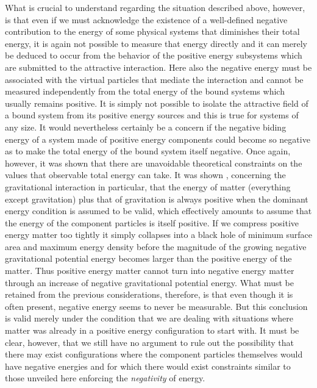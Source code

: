 \documentclass[notitlepage,12pt]{report}
\begin{document}
What is crucial to understand regarding the situation described above, however, is that even if we must acknowledge the existence of a well-defined negative contribution to the energy of some physical systems that diminishes their total energy, it is again not possible to measure that energy directly and it can merely be deduced to occur from the behavior of the positive energy subsystems which are submitted to the attractive interaction. Here also the negative energy must be associated with the virtual particles that mediate the interaction and cannot be measured independently from the total energy of the bound systems which usually remains positive. It is simply not possible to isolate the attractive field of a bound system from its positive energy sources and this is true for systems of any size. It would nevertheless certainly be a concern if the negative biding energy of a system made of positive energy components could become so negative as to make the total energy of the bound system itself negative. Once again, however, it was shown that there are unavoidable theoretical constraints on the values that observable total energy can take. It was shown \cite{Brill-1,Brill-2,Deser-1,Brill-3,Schoen-1,Schoen-2,Schoen-3,Schoen-4,Schoen-5}, concerning the gravitational interaction in particular, that the energy of matter (everything except gravitation) plus that of gravitation is always positive when the dominant energy condition is assumed to be valid, which effectively amounts to assume that the energy of the component particles is itself positive. If we compress positive energy matter too tightly it simply collapses into a black hole of minimum surface area and maximum energy density before the magnitude of the growing negative gravitational potential energy becomes larger than the positive energy of the matter. Thus positive energy matter cannot turn into negative energy matter through an increase of negative gravitational potential energy. What must be retained from the previous considerations, therefore, is that even though it is often present, negative energy seems to never be measurable. But this conclusion is valid merely under the condition that we are dealing with situations where matter was already in a positive energy configuration to start with. It must be clear, however, that we still have no argument to rule out the possibility that there may exist configurations where the component particles themselves would have negative energies and for which there would exist constraints similar to those unveiled here enforcing the \textit{negativity} of energy.
\end{document}
